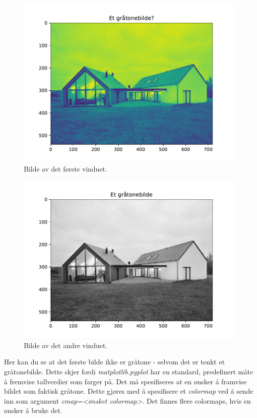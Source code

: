 \documentclass[%
oneside,                 %
final,                   %
10pt,norsk]{article}
\begin{document}
\begin{figure}[!ht]  %
  \centerline{\includegraphics[width=0.9\linewidth]{Figure_1.pdf}}
  \caption{
  Bilde av det første vinduet.
  }
\end{figure}



\begin{figure}[!ht]  %
  \centerline{\includegraphics[width=0.9\linewidth]{Figure_2.pdf}}
  \caption{
  Bilde av det andre vinduet.
  }
\end{figure}


Her kan du se at det første bilde ikke er gråtone - selvom det er tenkt et gråtonebilde. Dette skjer fordi \emph{matplotlib.pyplot} har en standard, predefinert måte å fremvise tallverdier som farger på.
Det må spesifiseres at en ønsker å framvise bildet som faktisk gråtone. Dette gjøres med å spesifisere et \emph{colormap} ved å sende inn som argument \emph{cmap=<ønsket colormap>}. Det finnes flere colormaps, hvis en ønsker å bruke det.
\end{document}
